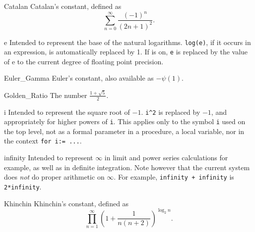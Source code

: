 \begin{list}{}{\renewcommand{\makelabel}[1]{\texttt{#1}\hspace{\fill}}%
               \setlength{\labelsep}{1em}%
               }

\item[Catalan] Catalan's constant, defined as
  \[
    \sum_{n=0}^{\infty} \frac{(-1)^{n}}{(2n+1)^{2}} .
  \]

\item[e] Intended to represent the base of%
the natural logarithms.  \texttt{log(e)}, if it occurs in an expression, is
automatically replaced by 1.  If  is
on, \texttt{e} is replaced by the value of e to the current degree of
floating point precision.

\item[Euler\_Gamma] Euler's constant, also available as $-\psi(1)$.

\item[Golden\_Ratio] The number $\frac{1+\sqrt{5}}{2}$.

\item[i] Intended to represent the square%
%
root of $-1$. \texttt{i\textasciicircum2} is replaced by $-1$, and
appropriately for higher powers of \texttt{i}.  This applies only to the
symbol \texttt{i} used on the top
level, not as a formal parameter in a procedure, a local variable, nor in
the context \texttt{for i:= ...}.

\item[infinity] Intended to represent $\infty$%
%
in limit and power series calculations for example, as well as in definite integration.
Note however that the
current system does \emph{not} do proper arithmetic on $\infty$.  For example,
\texttt{infinity + infinity} is \texttt{2*infinity}.

\item[Khinchin] Khinchin's constant, defined as
  \[
    \prod_{n=1}^{\infty}\left(1+\frac{1}{n(n+2)}\right)^{\log_{2} n} .
  \]


\end{list}
